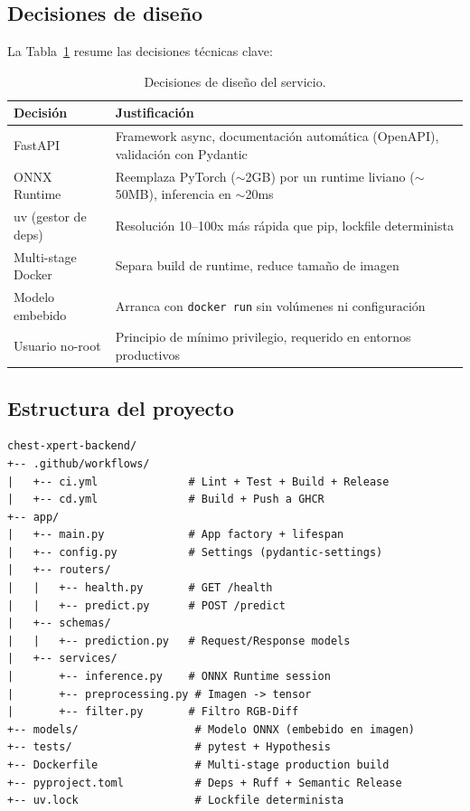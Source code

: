 \subsection{Decisiones de dise\~no}

La Tabla~\ref{tab:design-decisions} resume las decisiones t\'ecnicas clave:

\begin{table}[H]
\centering
\caption{Decisiones de dise\~no del servicio.}
\label{tab:design-decisions}
\small
\begin{tabularx}{\textwidth}{lX}
\toprule
\textbf{Decisi\'on} & \textbf{Justificaci\'on} \\
\midrule
FastAPI & Framework async, documentaci\'on autom\'atica (OpenAPI), validaci\'on con Pydantic \\
ONNX Runtime & Reemplaza PyTorch ($\sim$2GB) por un runtime liviano ($\sim$50MB), inferencia en $\sim$20ms \\
uv (gestor de deps) & Resoluci\'on 10--100x m\'as r\'apida que pip, lockfile determinista \\
Multi-stage Docker & Separa build de runtime, reduce tama\~no de imagen \\
Modelo embebido & Arranca con \texttt{docker run} sin vol\'umenes ni configuraci\'on \\
Usuario no-root & Principio de m\'inimo privilegio, requerido en entornos productivos \\
\bottomrule
\end{tabularx}
\end{table}

\subsection{Estructura del proyecto}

\begin{lstlisting}[language={}, caption={Estructura del repositorio chest-xpert-backend.}]
chest-xpert-backend/
+-- .github/workflows/
|   +-- ci.yml              # Lint + Test + Build + Release
|   +-- cd.yml              # Build + Push a GHCR
+-- app/
|   +-- main.py             # App factory + lifespan
|   +-- config.py           # Settings (pydantic-settings)
|   +-- routers/
|   |   +-- health.py       # GET /health
|   |   +-- predict.py      # POST /predict
|   +-- schemas/
|   |   +-- prediction.py   # Request/Response models
|   +-- services/
|       +-- inference.py    # ONNX Runtime session
|       +-- preprocessing.py # Imagen -> tensor
|       +-- filter.py       # Filtro RGB-Diff
+-- models/                  # Modelo ONNX (embebido en imagen)
+-- tests/                   # pytest + Hypothesis
+-- Dockerfile               # Multi-stage production build
+-- pyproject.toml           # Deps + Ruff + Semantic Release
+-- uv.lock                  # Lockfile determinista
\end{lstlisting}

